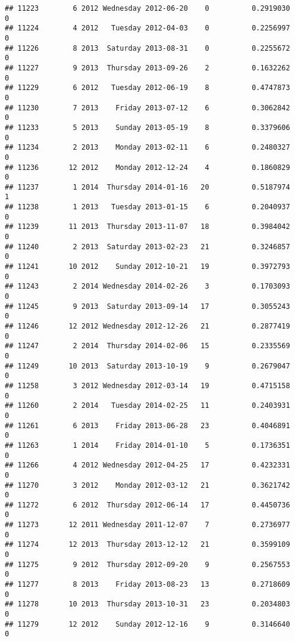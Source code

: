 \documentclass[
]{article}
\begin{document}
\begin{verbatim}
## 11223        6 2012 Wednesday 2012-06-20    0          0.2919030             0
## 11224        4 2012   Tuesday 2012-04-03    0          0.2256997             0
## 11226        8 2013  Saturday 2013-08-31    0          0.2255672             0
## 11227        9 2013  Thursday 2013-09-26    2          0.1632262             0
## 11229        6 2012   Tuesday 2012-06-19    8          0.4747873             0
## 11230        7 2013    Friday 2013-07-12    6          0.3062842             0
## 11233        5 2013    Sunday 2013-05-19    8          0.3379606             0
## 11234        2 2013    Monday 2013-02-11    6          0.2480327             0
## 11236       12 2012    Monday 2012-12-24    4          0.1860829             0
## 11237        1 2014  Thursday 2014-01-16   20          0.5187974             1
## 11238        1 2013   Tuesday 2013-01-15    6          0.2040937             0
## 11239       11 2013  Thursday 2013-11-07   18          0.3984042             0
## 11240        2 2013  Saturday 2013-02-23   21          0.3246857             0
## 11241       10 2012    Sunday 2012-10-21   19          0.3972793             0
## 11243        2 2014 Wednesday 2014-02-26    3          0.1703093             0
## 11245        9 2013  Saturday 2013-09-14   17          0.3055243             0
## 11246       12 2012 Wednesday 2012-12-26   21          0.2877419             0
## 11247        2 2014  Thursday 2014-02-06   15          0.2335569             0
## 11249       10 2013  Saturday 2013-10-19    9          0.2679047             0
## 11258        3 2012 Wednesday 2012-03-14   19          0.4715158             0
## 11260        2 2014   Tuesday 2014-02-25   11          0.2403931             0
## 11261        6 2013    Friday 2013-06-28   23          0.4046891             0
## 11263        1 2014    Friday 2014-01-10    5          0.1736351             0
## 11266        4 2012 Wednesday 2012-04-25   17          0.4232331             0
## 11270        3 2012    Monday 2012-03-12   21          0.3621742             0
## 11272        6 2012  Thursday 2012-06-14   17          0.4450736             0
## 11273       12 2011 Wednesday 2011-12-07    7          0.2736977             0
## 11274       12 2013  Thursday 2013-12-12   21          0.3599109             0
## 11275        9 2012  Thursday 2012-09-20    9          0.2567553             0
## 11277        8 2013    Friday 2013-08-23   13          0.2718609             0
## 11278       10 2013  Thursday 2013-10-31   23          0.2034803             0
## 11279       12 2012    Sunday 2012-12-16    9          0.3146640             0

\end{verbatim}
\end{document}
